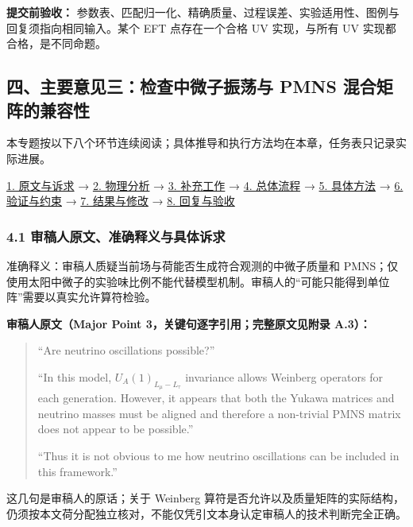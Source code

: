 \documentclass[
]{article}
\begin{document}
\textbf{提交前验收：}
参数表、匹配归一化、精确质量、过程误差、实验适用性、图例与回复须指向相同输入。某个
EFT 点存在一个合格 UV 实现，与所有 UV 实现都合格，是不同命题。

\subsection{四、主要意见三：检查中微子振荡与 PMNS
混合矩阵的兼容性}\label{ux56dbux4e3bux8981ux610fux89c1ux4e09ux68c0ux67e5ux4e2dux5faeux5b50ux632fux8361ux4e0e-pmns-ux6df7ux5408ux77e9ux9635ux7684ux517cux5bb9ux6027}

本专题按以下八个环节连续阅读；具体推导和执行方法均在本章，任务表只记录实际进展。

\hyperref[major-3-step-1]{1. 原文与诉求} → \hyperref[major-3-step-2]{2.
物理分析} → \hyperref[major-3-step-3]{3. 补充工作} →
\hyperref[major-3-step-4]{4. 总体流程} → \hyperref[major-3-step-5]{5.
具体方法} → \hyperref[major-3-step-6]{6. 验证与约束} →
\hyperref[major-3-step-7]{7. 结果与修改} → \hyperref[major-3-step-8]{8.
回复与验收}

\subsubsection{4.1
审稿人原文、准确释义与具体诉求}\label{ux5ba1ux7a3fux4ebaux539fux6587ux51c6ux786eux91caux4e49ux4e0eux5177ux4f53ux8bc9ux6c42-2}

准确释义：审稿人质疑当前场与荷能否生成符合观测的中微子质量和
PMNS；仅使用太阳中微子的实验味比例不能代替模型机制。审稿人的``可能只能得到单位阵''需要以真实允许算符检验。

\textbf{审稿人原文（Major Point 3，关键句逐字引用；完整原文见附录
A.3）：}

\begin{quote}
``Are neutrino oscillations possible?''

``In this model, \(U_A(1)_{L_\mu-L_\tau}\) invariance allows Weinberg
operators for each generation. However, it appears that both the Yukawa
matrices and neutrino masses must be aligned and therefore a non-trivial
PMNS matrix does not appear to be possible.''

``Thus it is not obvious to me how neutrino oscillations can be included
in this framework.''
\end{quote}

这几句是审稿人的原话；关于 Weinberg
算符是否允许以及质量矩阵的实际结构，仍须按本文荷分配独立核对，不能仅凭引文本身认定审稿人的技术判断完全正确。
\end{document}
